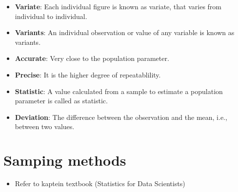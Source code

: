 \documentclass[
  ignorenonframetext,
  aspectratio=169]{beamer}
\providecommand{\tightlist}{%
  \setlength{\itemsep}{0pt}\setlength{\parskip}{0pt}}
\begin{document}
\begin{frame}{}
\protect\hypertarget{section-6}{}
\begin{itemize}
\tightlist
\item
  \textbf{Variate}: Each individual figure is known as variate, that
  varies from individual to individual.
\item
  \textbf{Variants}: An individual observation or value of any variable
  is known as variants.
\item
  \textbf{Accurate}: Very close to the population parameter.
\item
  \textbf{Precise}: It is the higher degree of repeatablility.
\item
  \textbf{Statistic}: A value calculated from a sample to estimate a
  population parameter is called as statistic.
\item
  \textbf{Deviation}: The difference between the observation and the
  mean, i.e., between two values.
\end{itemize}
\end{frame}

\hypertarget{samping-methods}{%
\section{Samping methods}\label{samping-methods}}

\begin{frame}{}
\protect\hypertarget{section-7}{}
\begin{itemize}
\tightlist
\item
  Refer to kaptein textbook (Statistics for Data Scientists)
\end{itemize}
\end{frame}
\end{document}
